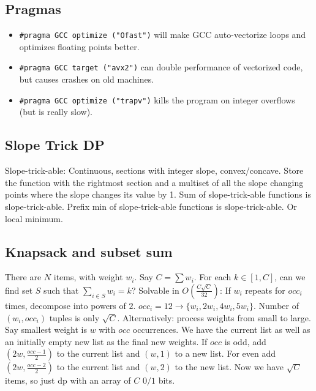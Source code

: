 	\subsection{Pragmas}
		\begin{itemize}
			\item \lstinline{#pragma GCC optimize ("Ofast")} will make GCC auto-vectorize loops and optimizes floating points better.
			\item \lstinline{#pragma GCC target ("avx2")} can double performance of vectorized code, but causes crashes on old machines.
			\item \lstinline{#pragma GCC optimize ("trapv")} kills the program on integer overflows (but is really slow).
		\end{itemize}

	\subsection{Slope Trick DP}
	Slope-trick-able: Continuous, sections with integer slope, convex/concave.
	Store the function with the rightmost section and a multiset of all the slope changing points where the slope changes its value by 1.
	Sum of slope-trick-able functions is slope-trick-able.
	Prefix min of slope-trick-able functions is slope-trick-able. Or local minimum.
	\subsection{Knapsack and subset sum}
	There are $N$ items, with weight $w_i$. Say $C=\sum w_i$. For each $k\in [1,C]$, can we find set $S$ such that $\sum_{i\in S}w_i=k$?
	Solvable in $O(\frac{C\sqrt{C}}{32})$: If $w_i$ repeats for $occ_i$ times, decompose into powers of $2$.
	$occ_i=12 \to \{w_i, 2w_i, 4w_i, 5w_i\}$. Number of $(w_i, occ_i)$ tuples is only $\sqrt{C}$.
	Alternatively: process weights from small to large. Say smallest weight is $w$ with $occ$ occurrences. 
	We have the current list as well as an initially empty new list as the final new weights.
	If $occ$ is odd, add $(2w, \frac{occ-1}{2})$ to the current list and $(w, 1)$ to a new list. 
	For even add $(2w, \frac{occ-2}{2})$ to the current list and $(w, 2)$ to the new list.
	Now we have $\sqrt{C}$ items, so just dp with an array of $C$ $0/1$ bits.

